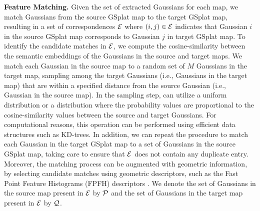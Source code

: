 \smallskip
\noindent\textbf{Feature Matching.}
Given the set of extracted Gaussians for each map, we match Gaussians from the source GSplat map to the target GSplat map, resulting in a set of correspondences $\mathcal{E}$ where ${(i, j) \in \mathcal{E}}$ indicates that Gaussian $i$ in the source GSplat map corresponds to Gaussian $j$ in target GSplat map. To identify the candidate matches in $\mathcal{E}$, we compute the cosine-similarity between the semantic embeddings of the Gaussians in the source and target maps. We match each Gaussian in the source map to a random set of $M$ Gaussians in the target map, sampling among the target Gaussians (i.e., Gaussians in the target map) that are within a specified distance from the source Gaussian (i.e., Gaussian in the source map). In the sampling step, \algname can utilize a uniform distribution or a distribution where the probability values are proportional to the cosine-similarity values between the source and target Gaussians. For computational reasons, this operation can be performed using efficient data structures such as KD-trees. In addition, we can repeat the procedure to match each Gaussian in the target GSplat map to a set of Gaussians in the source GSplat map, taking care to ensure that $\mathcal{E}$ does not contain any duplicate entry. Moreover, the matching process can be augmented with geometric information, by selecting candidate matches using geometric descriptors, such as the Fast Point Feature Histograms (FPFH) descriptors \cite{rusu2009fast}. We denote the set of Gaussians in the source map present in $\mathcal{E}$ by $\mathcal{P}$ and the set of Gaussians in the target map present in $\mathcal{E}$ by $\mathcal{Q}$.

